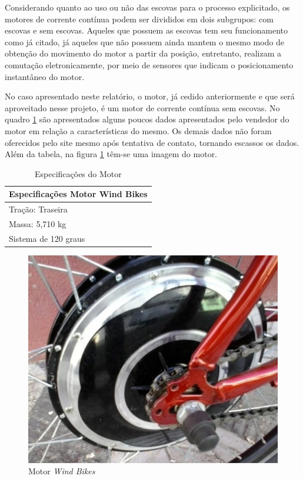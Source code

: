  Considerando quanto ao uso ou não das escovas para o processo explicitado, os motores de corrente contínua podem ser divididos em dois subgrupos: com escovas e sem escovas. Aqueles que possuem as escovas tem seu funcionamento como já citado, já aqueles que não possuem ainda mantem o mesmo modo de obtenção do movimento do motor a partir da posição, entretanto, realizam a comutação eletronicamente, por meio de sensores que indicam o posicionamento instantâneo do motor. 

No caso apresentado neste relatório, o motor, já cedido anteriormente e que será aproveitado nesse projeto, é um motor de corrente contínua sem escovas. No quadro \ref{esp_motor} são apresentados alguns poucos dados apresentados pelo vendedor do motor em relação a características do mesmo. Os demais dados não foram oferecidos pelo site mesmo após tentativa de contato, tornando escassos os dados. Além da tabela, na figura \ref{img:motor} têm-se uma imagem do motor.

\begin{table}[h!]
\centering
\caption{Especificações do Motor}
\label{esp_motor}
\begin{tabular}{|l|}
\hline
Especificações Motor Wind Bikes \\ \hline
Tração: Traseira                \\ \hline
Massa: 5,710 kg                 \\ \hline
Sistema de 120 graus            \\ \hline
\end{tabular}
\end{table}

\graphicspath{{figuras/}}
\begin{figure}[h!]
\centering
\includegraphics[scale=0.80]{motor.png}
\caption{Motor \textit{Wind Bikes}}
\label{img:motor}
\end{figure}
	
